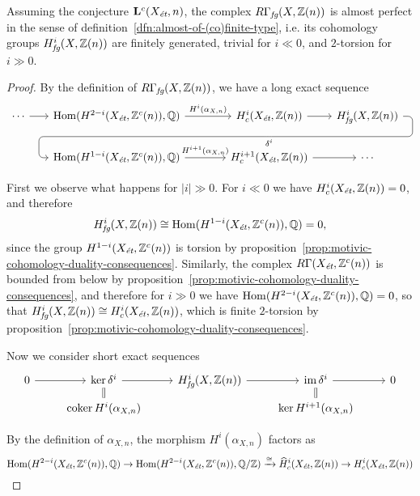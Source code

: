 \documentclass{article}
\numberwithin{equation}{section}
\begin{document}
\begin{proposition}
  \label{prop:RGammafg-almost-perfect}
  Assuming the conjecture $\mathbf{L}^c (X_\et, n)$,
  the complex $R\Gamma_\fg (X, \ZZ (n))$ is almost perfect in the
  sense of definition~\ref{dfn:almost-of-(co)finite-type}, i.e. its cohomology
  groups $H^i_\fg (X, \ZZ (n))$ are finitely generated, trivial for $i \ll 0$,
  and $2$-torsion for $i \gg 0$.

  \begin{proof}
    By the definition of $R\Gamma_\fg (X, \ZZ (n))$, we have a long exact
    sequence
    \[ \begin{tikzcd}[column sep=1.75em]
      \cdots\ar{r} & \Hom (H^{2-i} (X_\et, \ZZ^c (n)), \QQ) \ar{r}{H^i (\alpha_{X,n})} &[2em] H^i_c (X_\et, \ZZ (n))\ar{r}\ar[draw=none]{d}[name=X, anchor=center]{} & H^i_\fg (X, \ZZ (n)) \ar[rounded corners,to path={ -- ([xshift=2ex]\tikztostart.east) |- (X.center) \tikztonodes -| ([xshift=-2ex]\tikztotarget.west) -- (\tikztotarget)}]{dll}[at end]{\delta^i} \\
      & \Hom (H^{1-i} (X_\et, \ZZ^c (n)), \QQ)\ar{r}{H^{i+1} (\alpha_{X,n})} & H^{i+1}_c (X_\et, \ZZ (n))\ar{r} & \cdots
    \end{tikzcd} \]

    First we observe what happens for $|i| \gg 0$.
    For $i \ll 0$ we have $H^i_c (X_\et, \ZZ (n)) = 0$, and therefore
    $$H^i_\fg (X, \ZZ (n)) \cong \Hom (H^{1-i} (X_\et, \ZZ^c (n)), \QQ) = 0,$$
    since the group $H^{1-i} (X_\et, \ZZ^c (n))$ is torsion by
    proposition~\ref{prop:motivic-cohomology-duality-consequences}.
    Similarly, the complex $R\Gamma (X_\et, \ZZ^c (n))$ is bounded from below by
    proposition~\ref{prop:motivic-cohomology-duality-consequences}, and therefore
    for $i \gg 0$ we have
    $\Hom (H^{2-i} (X_\et, \ZZ^c (n)), \QQ) = 0$, so that
    $H^i_\fg (X, \ZZ (n)) \cong H^i_c (X_\et, \ZZ (n))$, which is finite
    $2$-torsion by proposition~\ref{prop:motivic-cohomology-duality-consequences}.

    Now we consider short exact sequences
    \[ \begin{tikzcd}[row sep=0.5em]
      0 \ar{r} & \ker \delta^i \ar{r}\ar[equals]{d} & H^i_\fg (X, \ZZ (n)) \ar{r} & \im \delta^i \ar{r}\ar[equals]{d} & 0\\
      & \coker H^i (\alpha_{X,n}) & & \ker H^{i+1} (\alpha_{X,n})
    \end{tikzcd} \]

    By the definition of $\alpha_{X,n}$, the morphism $H^i (\alpha_{X,n})$ factors as
    \[ \Hom (H^{2-i} (X_\et, \ZZ^c (n)), \QQ) \to
    \Hom (H^{2-i} (X_\et, \ZZ^c (n)), \QQ/\ZZ) \xrightarrow{\cong}
    \widehat{H}^i_c (X_\et, \ZZ (n)) \to H^i_c (X_\et, \ZZ (n)) \]


\end{proof}
\end{proposition}
\end{document}

